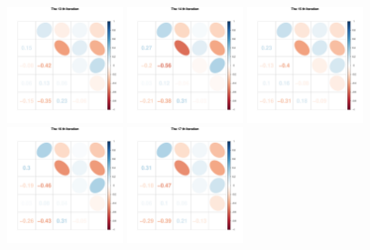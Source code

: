 \begin{figure}[h]\ContinuedFloat
\centering
\includegraphics[width=0.3\textwidth,height=0.2\textheight]{Chapters/05MCMCOU/plots/paraEvolution/corMatrix13.pdf}
\includegraphics[width=0.3\textwidth,height=0.2\textheight]{Chapters/05MCMCOU/plots/paraEvolution/corMatrix14.pdf}
\includegraphics[width=0.3\textwidth,height=0.2\textheight]{Chapters/05MCMCOU/plots/paraEvolution/corMatrix15.pdf}
\includegraphics[width=0.3\textwidth,height=0.2\textheight]{Chapters/05MCMCOU/plots/paraEvolution/corMatrix16.pdf}
\includegraphics[width=0.3\textwidth,height=0.2\textheight]{Chapters/05MCMCOU/plots/paraEvolution/corMatrix17.pdf}

\end{figure}

